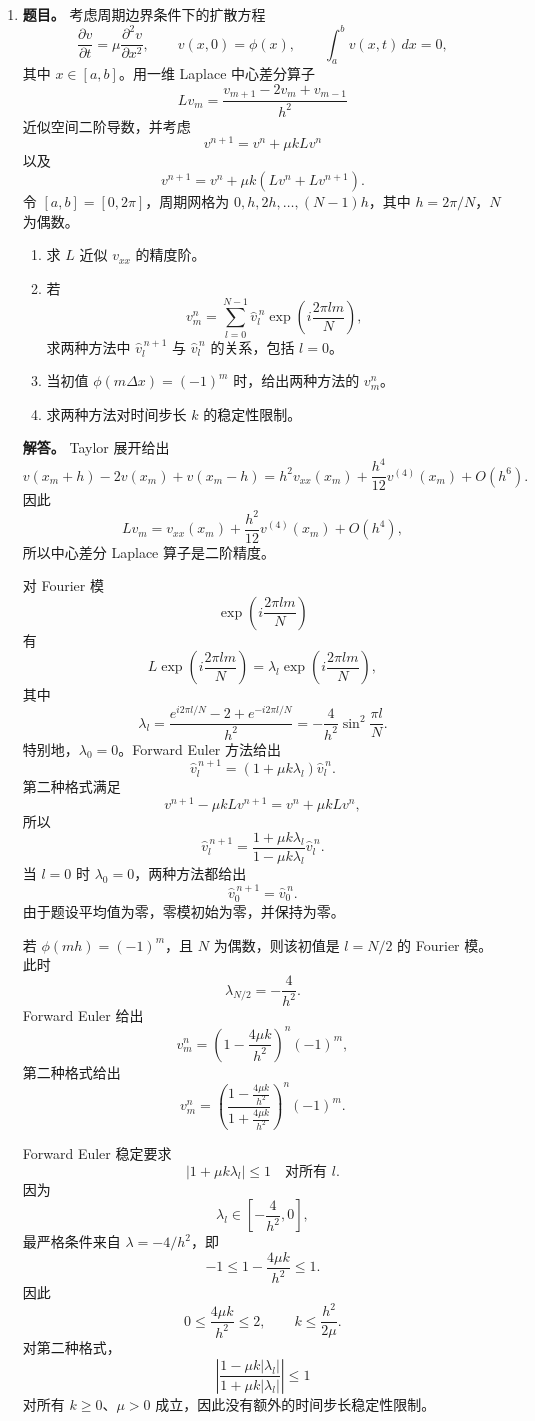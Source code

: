 ﻿\documentclass[UTF8,12pt]{ctexart}
\begin{document}
\begin{enumerate}[label=\textbf{\arabic*.},leftmargin=2.2em]
\item \textbf{题目。} 考虑周期边界条件下的扩散方程
\[
\frac{\partial v}{\partial t}
=\mu\frac{\partial^2 v}{\partial x^2},
\qquad
v(x,0)=\phi(x),\qquad
\int_a^b v(x,t)\,dx=0,
\]
其中 \(x\in[a,b]\)。用一维 Laplace 中心差分算子
\[
Lv_m=\frac{v_{m+1}-2v_m+v_{m-1}}{h^2}
\]
近似空间二阶导数，并考虑
\[
v^{n+1}=v^n+\mu kLv^n
\]
以及
\[
v^{n+1}=v^n+\mu k(Lv^n+Lv^{n+1}).
\]
令 \([a,b]=[0,2\pi]\)，周期网格为 \(0,h,2h,\ldots,(N-1)h\)，其中 \(h=2\pi/N\)，\(N\) 为偶数。
\begin{enumerate}[label=(\alph*),leftmargin=2.0em]
\item 求 \(L\) 近似 \(v_{xx}\) 的精度阶。
\item 若
\[
v_m^n=\sum_{l=0}^{N-1}\widehat v_l^{\,n}
\exp\!\left(i\frac{2\pi lm}{N}\right),
\]
求两种方法中 \(\widehat v_l^{\,n+1}\) 与 \(\widehat v_l^{\,n}\) 的关系，包括 \(l=0\)。
\item 当初值 \(\phi(m\Delta x)=(-1)^m\) 时，给出两种方法的 \(v_m^n\)。
\item 求两种方法对时间步长 \(k\) 的稳定性限制。
\end{enumerate}

\textbf{解答。} Taylor 展开给出
\[
v(x_m+h)-2v(x_m)+v(x_m-h)
=h^2v_{xx}(x_m)+\frac{h^4}{12}v^{(4)}(x_m)+O(h^6).
\]
因此
\[
Lv_m=v_{xx}(x_m)+\frac{h^2}{12}v^{(4)}(x_m)+O(h^4),
\]
所以中心差分 Laplace 算子是二阶精度。

对 Fourier 模
\[
\exp\!\left(i\frac{2\pi lm}{N}\right)
\]
有
\[
L\exp\!\left(i\frac{2\pi lm}{N}\right)
=\lambda_l\exp\!\left(i\frac{2\pi lm}{N}\right),
\]
其中
\[
\lambda_l
=\frac{e^{i2\pi l/N}-2+e^{-i2\pi l/N}}{h^2}
=-\frac4{h^2}\sin^2\frac{\pi l}{N}.
\]
特别地，\(\lambda_0=0\)。Forward Euler 方法给出
\[
\widehat v_l^{\,n+1}
=\left(1+\mu k\lambda_l\right)\widehat v_l^{\,n}.
\]
第二种格式满足
\[
v^{n+1}-\mu kLv^{n+1}=v^n+\mu kLv^n,
\]
所以
\[
\widehat v_l^{\,n+1}
=\frac{1+\mu k\lambda_l}{1-\mu k\lambda_l}\widehat v_l^{\,n}.
\]
当 \(l=0\) 时 \(\lambda_0=0\)，两种方法都给出
\[
\widehat v_0^{\,n+1}=\widehat v_0^{\,n}.
\]
由于题设平均值为零，零模初始为零，并保持为零。

若 \(\phi(mh)=(-1)^m\)，且 \(N\) 为偶数，则该初值是 \(l=N/2\) 的 Fourier 模。此时
\[
\lambda_{N/2}=-\frac4{h^2}.
\]
Forward Euler 给出
\[
v_m^n=\left(1-\frac{4\mu k}{h^2}\right)^n(-1)^m,
\]
第二种格式给出
\[
v_m^n=
\left(\frac{1-\frac{4\mu k}{h^2}}{1+\frac{4\mu k}{h^2}}\right)^n(-1)^m.
\]

Forward Euler 稳定要求
\[
|1+\mu k\lambda_l|\le1
\quad\text{对所有 }l.
\]
因为
\[
\lambda_l\in\left[-\frac4{h^2},0\right],
\]
最严格条件来自 \(\lambda=-4/h^2\)，即
\[
-1\le1-\frac{4\mu k}{h^2}\le1.
\]
因此
\[
0\le\frac{4\mu k}{h^2}\le2,
\qquad
k\le\frac{h^2}{2\mu}.
\]
对第二种格式，
\[
\left|\frac{1-\mu k|\lambda_l|}{1+\mu k|\lambda_l|}\right|\le1
\]
对所有 \(k\ge0\)、\(\mu>0\) 成立，因此没有额外的时间步长稳定性限制。
\end{enumerate}
\end{document}

